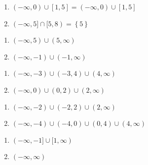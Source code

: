 \documentclass[11pt]{article}
\theoremstyle{definition}  %
\newcounter{HW}
\begin{document}
\begin{multicols}{2}
\begin{enumerate}
\setcounter{enumi}{\value{HW}}

\item $(-\infty, 0) \cup [1,5] = (-\infty,0) \cup [1,5]$

\item $(-\infty, 5] \cap [5,8) = \left\{ 5\right\}$

\setcounter{HW}{\value{enumi}}
\end{enumerate}
\end{multicols}

\begin{multicols}{2}
\begin{enumerate}
\setcounter{enumi}{\value{HW}}

\item  $(-\infty, 5) \cup (5, \infty)$

\item  $(-\infty, -1) \cup (-1, \infty)$

\setcounter{HW}{\value{enumi}}
\end{enumerate}
\end{multicols}


\begin{multicols}{2}
\begin{enumerate}
\setcounter{enumi}{\value{HW}}

\item  $(-\infty, -3) \cup (-3, 4)\cup (4, \infty)$


\item   $(-\infty, 0) \cup (0, 2)\cup (2, \infty)$

\setcounter{HW}{\value{enumi}}
\end{enumerate}
\end{multicols}


\begin{multicols}{2}
\begin{enumerate}
\setcounter{enumi}{\value{HW}}

\item  $(-\infty, -2) \cup (-2, 2)\cup (2, \infty)$

\item  $(-\infty, -4) \cup (-4, 0) \cup (0, 4) \cup (4, \infty)$

\setcounter{HW}{\value{enumi}}
\end{enumerate}
\end{multicols}

\begin{multicols}{2}
\begin{enumerate}
\setcounter{enumi}{\value{HW}}

\item $(-\infty, -1] \cup [1, \infty)$

\item $(-\infty, \infty)$


\setcounter{HW}{\value{enumi}}
\end{enumerate}
\end{multicols}
\end{document}
